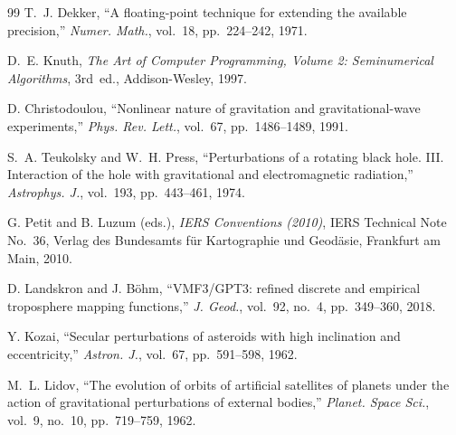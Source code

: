 \documentclass[11pt,a4paper,reqno]{article}
\theoremstyle{plain}
\theoremstyle{definition}
\theoremstyle{remark}
\numberwithin{equation}{section}
\numberwithin{table}{section}
\begin{document}
\begin{thebibliography}{99}
T.~J. Dekker, ``A floating-point technique for extending the available precision,'' \emph{Numer. Math.}, vol.~18, pp.~224--242, 1971.

D.~E. Knuth, \emph{The Art of Computer Programming, Volume 2: Seminumerical Algorithms}, 3rd~ed., Addison-Wesley, 1997.

D. Christodoulou, ``Nonlinear nature of gravitation and gravitational-wave experiments,'' \emph{Phys. Rev. Lett.}, vol.~67, pp.~1486--1489, 1991.

S.~A. Teukolsky and W.~H. Press, ``Perturbations of a rotating black hole. III. Interaction of the hole with gravitational and electromagnetic radiation,'' \emph{Astrophys. J.}, vol.~193, pp.~443--461, 1974.

G. Petit and B. Luzum (eds.), \emph{IERS Conventions (2010)}, IERS Technical Note No.~36, Verlag des Bundesamts f\"ur Kartographie und Geod\"asie, Frankfurt am Main, 2010.

D. Landskron and J. B\"ohm, ``VMF3/GPT3: refined discrete and empirical troposphere mapping functions,'' \emph{J. Geod.}, vol.~92, no.~4, pp.~349--360, 2018.

Y. Kozai, ``Secular perturbations of asteroids with high inclination and eccentricity,'' \emph{Astron. J.}, vol.~67, pp.~591--598, 1962.

M.~L. Lidov, ``The evolution of orbits of artificial satellites of planets under the action of gravitational perturbations of external bodies,'' \emph{Planet. Space Sci.}, vol.~9, no.~10, pp.~719--759, 1962.

\end{thebibliography}

\end{document}
